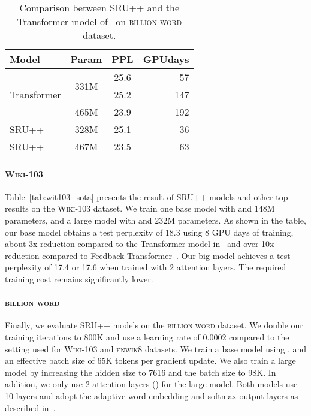 \documentclass[11pt,a4paper]{article}
\begin{document}
\begin{table}[t!]
    \centering
    \begin{tabular}{lccr}
    \toprule
    \bf Model & \bf Param & \bf PPL & \bf GPUdays\\
    \hline
    \multirow{3}{*}{Transformer} & \multirow{2}{*}{331M} & 25.6 & 57\\
    & & 25.2 & 147\\
    & 465M & 23.9 & 192 \\
    \hline
    SRU++ & 328M & 25.1 & 36\\
    SRU++ & 467M & 23.5 & 63\\
\bottomrule
    \end{tabular}
    \caption{Comparison between SRU++ and the Transformer model of~\citet{baevski2018adaptive} on \textsc{billion word} dataset.}
    \label{tab:1blm}
\end{table}

\paragraph{\textsc{Wiki-103}}
Table~\ref{tab:wit103_sota} presents the result of SRU++ models and other top results on the \textsc{Wiki-103} dataset. 
We train one base model with  and 148M parameters, and a large model with  and 232M parameters.
As shown in the table, our base model obtains a test perplexity of 18.3 using 8 GPU days of training, about 3x reduction compared to the Transformer model in~\cite{baevski2018adaptive} and over 10x reduction compared to Feedback Transformer~\cite{fan2020accessing}.
Our big model achieves a test perplexity of 17.4 or 17.6 when trained with 2 attention layers.
The required training cost remains significantly lower.


\paragraph{\textsc{billion word}}
Finally, we evaluate SRU++ models on the \textsc{billion word} dataset. 
We double our training iterations to 800K and use a learning rate of 0.0002 compared to the setting used for \textsc{Wiki-103} and \textsc{enwik8} datasets. 
We train a base model using ,  and an effective batch size of 65K tokens per gradient update.
We also train a large model by increasing the hidden size  to 7616 and the batch size to 98K.
In addition, we only use 2 attention layers () for the large model.
Both models use 10 layers and adopt the adaptive word embedding and softmax output layers as described in~\citet{baevski2018adaptive}.
\end{document}
